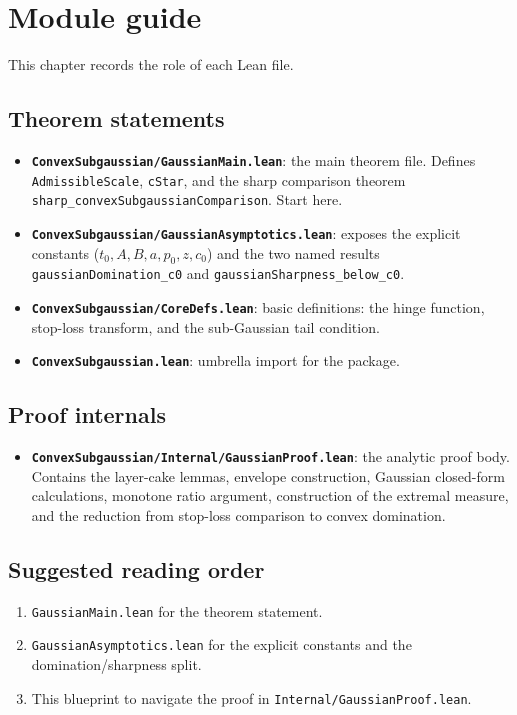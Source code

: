 \chapter{Module guide}\label{chap:modules}

This chapter records the role of each Lean file.

\section{Theorem statements}

\begin{itemize}
\item \textbf{\texttt{ConvexSubgaussian/GaussianMain.lean}}:
  the main theorem file. Defines \texttt{AdmissibleScale}, \texttt{cStar},
  and the sharp comparison theorem
  \texttt{sharp\_convexSubgaussianComparison}. Start here.
\item \textbf{\texttt{ConvexSubgaussian/GaussianAsymptotics.lean}}:
  exposes the explicit constants ($t_0, A, B, a, p_0, z, c_0$) and the
  two named results \texttt{gaussianDomination\_c0} and
  \texttt{gaussianSharpness\_below\_c0}.
\item \textbf{\texttt{ConvexSubgaussian/CoreDefs.lean}}:
  basic definitions: the hinge function, stop-loss transform, and the
  sub-Gaussian tail condition.
\item \textbf{\texttt{ConvexSubgaussian.lean}}:
  umbrella import for the package.
\end{itemize}

\section{Proof internals}

\begin{itemize}
\item \textbf{\texttt{ConvexSubgaussian/Internal/GaussianProof.lean}}:
  the analytic proof body. Contains the layer-cake lemmas,
  envelope construction, Gaussian closed-form calculations, monotone
  ratio argument, construction of the extremal measure, and the reduction
  from stop-loss comparison to convex domination.
\end{itemize}

\section{Suggested reading order}

\begin{enumerate}
\item \texttt{GaussianMain.lean} for the theorem statement.
\item \texttt{GaussianAsymptotics.lean} for the explicit constants
  and the domination/sharpness split.
\item This blueprint to navigate the proof in
  \texttt{Internal/GaussianProof.lean}.
\end{enumerate}
